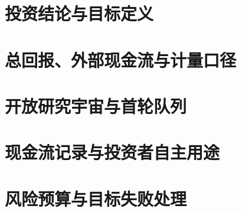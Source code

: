 \documentclass[a4paper,11pt,openany,fontset=none]{ctexrep}
\begin{document}
\astockcover

\begin{abstract}
本报告经最新授权修正后，只保留一个可审计的策略研究目标：在完整、正式指定组合上，争取滚动五年、成本后年化时间加权收益率（TWRR）达到5\%。这不是年度下限、收益保证、概率判断或实施授权。现金分配是总回报和产品尽调的一项事实输入，而非独立的收款目标、覆盖门槛或年度验收项；一笔已结算分配在总回报中只作一次处理。

本次修正取消把首轮产品尽调范围当作永久投资限制的做法。研究宇宙向合规可及的直接股票、ETF、公募REIT、债券与现金工具开放；现有十只产品只是首轮证据队列。任何候选仍须先进入有限、带日期的决策宇宙，完成与其结构相适应的权益研究级尽调，再接受独立估值、风险、流动性、税务/运营和组合层复核。没有资产类别配额必须填满，现金也可以是有效选择。

当前批准可投池与批准组合均为空。正式回放、候选标的风险预算、适当性、账户税费和实时资格未完成前，所有市场交易资产$q=0$；这表示模型未授予市场风险配置权限，并不推定任何账户的实际余额或现金用途。本报告不提供实时价格、买卖数量、交易时点、税务意见、适当性认证、订单或任何收益保证。
\end{abstract}

{\small
\setcounter{tocdepth}{0}
\tableofcontents
\par}
\clearpage

\chapter{投资结论与目标定义}


\chapter{总回报、外部现金流与计量口径}


\chapter{开放研究宇宙与首轮队列}


\chapter{现金流记录与投资者自主用途}


\chapter{风险预算与目标失败处理}

\end{document}
